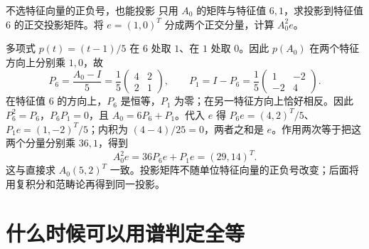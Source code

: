 \begin{example}{不选特征向量的正负号，也能投影}
只用 $A_0$ 的矩阵与特征值 $6,1$，求投影到特征值 $6$ 的正交投影矩阵。将 $e=(1,0)^T$ 分成两个正交分量，计算 $A_0^2e$。
\end{example}
\begin{solution}
多项式 $p(t)=(t-1)/5$ 在 $6$ 处取 $1$、在 $1$ 处取 $0$。因此 $p(A_0)$ 在两个特征方向上分别乘 $1,0$，故
\[
P_6=\frac{A_0-I}{5}=\frac15\begin{pmatrix}4&2\\2&1\end{pmatrix},
\qquad
P_1=I-P_6=\frac15\begin{pmatrix}1&-2\\-2&4\end{pmatrix}.
\]
在特征值 $6$ 的方向上，$P_6$ 是恒等，$P_1$ 为零；在另一特征方向上恰好相反。因此 $P_6^2=P_6$，$P_6P_1=0$，且 $A_0=6P_6+P_1$。代入 $e$ 得 $P_6e=(4,2)^T/5$、$P_1e=(1,-2)^T/5$；内积为 $(4-4)/25=0$，两者之和是 $e$。作用两次等于把这两个分量分别乘 $36,1$，得到
\[
A_0^2e=36P_6e+P_1e=(29,14)^T.
\]
这与直接求 $A_0(5,2)^T$ 一致。投影矩阵不随单位特征向量的正负号改变；后面将用复积分和范畴论再得到同一投影。
\end{solution}

\section{什么时候可以用谱判定全等}

